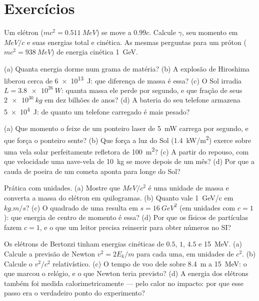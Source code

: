 \section{Exercícios}

\begin{exercise}[$\star$]\label{exo:b3:relativistic-dynamics:1}
Um elétron ($mc^2 = \qty{0.511}{MeV}$) se move a $0.99c$. Calcule
$\gamma$, seu momento em $\unit{MeV}/c$ e suas energias total e
cinética. As mesmas perguntas para um próton ($mc^2 = \qty{938}{MeV}$)
de energia cinética \qty{1}{GeV}.
\end{exercise}

\begin{exercise}[$\star$]\label{exo:b3:relativistic-dynamics:2}
(a) Quanta energia dorme num grama de matéria? (b) A explosão de
Hiroshima liberou cerca de \qty{6e13}{J}: que diferença de massa é
essa? (c) O Sol irradia $L = \qty{3.8e26}{W}$: quanta massa ele perde
por segundo, e que fração de seus $\qty{2e30}{kg}$ em dez bilhões de
anos? (d) A bateria do seu telefone armazena \qty{5e4}{J}: de quanto um
telefone carregado é mais pesado?
\end{exercise}

\begin{exercise}[$\star$]\label{exo:b3:relativistic-dynamics:3}
(a) Que momento o feixe de um ponteiro laser de \qty{5}{mW} carrega por
segundo, e que força o ponteiro sente? (b) Que força a luz do Sol
(\qty{1.4}{kW/m^2}) exerce sobre uma vela solar perfeitamente refletora
de \qty{100}{m^2}? (c) A partir do repouso, com que velocidade uma
nave-vela de \qty{10}{kg} se move depois de um mês? (d) Por que a cauda
de poeira de um cometa aponta para longe do Sol?
\end{exercise}

\begin{exercise}[$\star$]\label{exo:b3:relativistic-dynamics:4}
Prática com unidades. (a) Mostre que $\unit{MeV}/c^2$ é uma unidade de
massa e converta a massa do elétron em quilogramas. (b) Quanto vale
\qty{1}{GeV/c} em $\unit{kg.m/s}$? (c) O quadrado de uma  resulta em $s = \qty{16}{GeV^2}$ (em unidades com $c = 1$):
que energia de centro de momento é essa? (d) Por que os físicos de
partículas fazem $c = 1$, e o que um leitor precisa reinserir para
obter números no SI?
\end{exercise}

\begin{exercise}[$\star\star$]\label{exo:b3:relativistic-dynamics:5}
Os elétrons de Bertozzi tinham energias cinéticas de $0.5$, $1$, $4.5$
e \qty{15}{MeV}. (a) Calcule a previsão de Newton $v^2 = 2E_k/m$ para
cada uma, em unidades de $c^2$. (b) Calcule o $v^2/c^2$ relativístico.
(c) O tempo de voo dele sobre \qty{8.4}{m} a \qty{15}{MeV}: o que
marcou o relógio, e o que Newton teria previsto? (d) A energia dos
elétrons também foi medida calorimetricamente --- pelo calor no
impacto: por que esse passo era o verdadeiro ponto do experimento?
\end{exercise}

